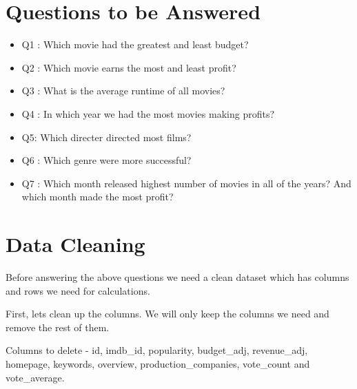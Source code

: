 \documentclass[11pt]{article}
\providecommand{\tightlist}{%
      \setlength{\itemsep}{0pt}\setlength{\parskip}{0pt}}
\begin{document}
    \section{Questions to be Answered}\label{questions-to-be-answered}

\begin{itemize}
\tightlist
\item
  Q1 : Which movie had the greatest and least budget?
\item
  Q2 : Which movie earns the most and least profit?
\item
  Q3 : What is the average runtime of all movies?
\item
  Q4 : In which year we had the most movies making profits?
\item
  Q5: Which directer directed most films?
\item
  Q6 : Which genre were more successful?
\item
  Q7 : Which month released highest number of movies in all of the
  years? And which month made the most profit?
\end{itemize}

    \section{Data Cleaning}\label{data-cleaning}

Before answering the above questions we need a clean dataset which has
columns and rows we need for calculations.

First, lets clean up the columns. We will only keep the columns we need
and remove the rest of them.

Columns to delete - id, imdb\_id, popularity, budget\_adj, revenue\_adj,
homepage, keywords, overview, production\_companies, vote\_count and
vote\_average.
\end{document}
